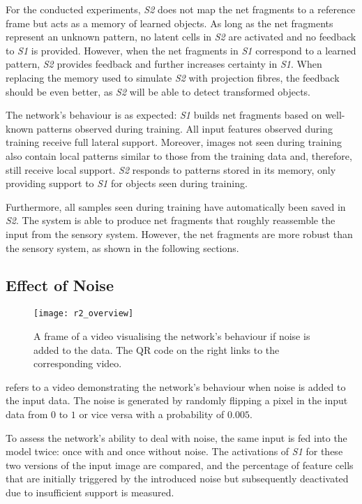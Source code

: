 For the conducted experiments, \emph{S2} does not map the net fragments to a reference frame but acts as a memory of learned objects.
As long as the net fragments represent an unknown pattern, no latent cells in \emph{S2} are activated and no feedback to \emph{S1} is provided.
However, when the net fragments in \emph{S1} correspond to a learned pattern, \emph{S2} provides feedback and further increases certainty in \emph{S1}.
When replacing the memory used to simulate \emph{S2} with projection fibres, the feedback should be even better, as \emph{S2} will be able to detect transformed objects.

The network's behaviour is as expected: \emph{S1} builds net fragments based on well-known patterns observed during training.
All input features observed during training receive full lateral support.
Moreover, images not seen during training also contain local patterns similar to those from the training data and, therefore, still receive local support.
\emph{S2} responds to patterns stored in its memory, only providing support to \emph{S1} for objects seen during training.

Furthermore, all samples seen during training have automatically been saved in \emph{S2}.
The system is able to produce net fragments that roughly reassemble the input from the sensory system.
However, the net fragments are more robust than the sensory system, as shown in the following sections.

\subsection{Effect of Noise}
%
\begin{figure}[h]
    \centering
    \texttt{[image: r2\_overview]}
    \caption[Video visualising the network's behaviour with noise in input]{A frame of a video visualising the network's behaviour if noise is added to the data. The QR code on the right links to the corresponding video.}
\end{figure}
%
 refers to a video demonstrating the network's behaviour when noise is added to the input data.
The noise is generated by randomly flipping a pixel in the input data from $0$ to $1$ or vice versa with a probability of $0.005$.

To assess the network's ability to deal with noise, the same input is fed into the model twice: once with and once without noise. The activations of \emph{S1} for these two versions of the input image are compared, and the percentage of feature cells that are initially triggered by the introduced noise but subsequently deactivated due to insufficient support is measured.


